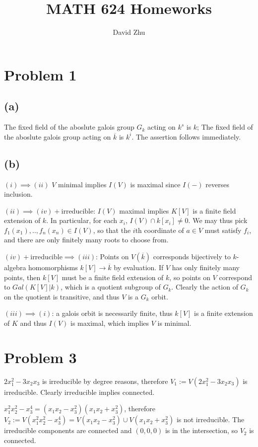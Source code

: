 \documentclass{article}
\title{MATH 624 Homeworks}
\author{David Zhu}
\theoremstyle{definition}
\theoremstyle{definition}
\theoremstyle{definition}
\theoremstyle{definition}
\theoremstyle{definition}
\theoremstyle{definition}
\theoremstyle{definition}
\begin{document}
\maketitle

\section*{Problem 1}
\subsection*{(a)}
The fixed field of the aboslute galois group $G_k$ acting on $k^s$ is $k$; The fixed field of the aboslute galois group acting on $\overline{k}$ is $k^i$. The assertion follows immediately. 


\subsection*{(b)}
$(i)\implies (ii)$ $V$ minimal implies $I(V)$ is maximal since $I(-)$ reverses inclusion. 

$(ii)\implies (iv)+\textrm{irreducible}$: $I(V)$ maximal implies $K[V]$ is a finite field extension of $k$. In particular, for each $x_i$, $I(V)\cap k[x_i]\neq 0$. We may thus pick $f_1(x_1),..,f_n(x_n)\in I(V)$, so that the $i$th  coordinate of $a\in V$ must satisfy $f_i$, and there are only finitely many roots to choose from. 

$(iv)+\textrm{irreducible}\implies (iii)$: Points on $V(\overline{k})$ corresponds bijectively to $k$-algebra homomorphisms $k[V]\to \overline{k}$ by evaluation. If $V$ has only finitely many points, then $k[V]$ must be a finite field extension of $k$, so points on $V$ correspond to $Gal(K[V]|k)$, which is a quotient subgroup of $G_k$. Clearly the action of $G_k$ on the quotient is transitive, and thus $V$ is a $G_k$ orbit. 

$(iii)\implies (i)$: a galois orbit is necessarily finite, thus $k[V]$ is a finite extension of $K$ and thus $I(V)$ is maximal, which implies $V$ is minimal.

\section*{Problem 3}
$2x_1^2-3x_2x_3$ is irreducible by degree reasons, therefore $V_1:=V(2x_1^2-3x_2x_3)$ is irreducible. Clearly irreducible implies connected. 

$x_1^2x_2^2-x_3^4=(x_1x_2-x_3^2)(x_1x_2+x_3^2)$, therefore $V_2:=V(x_1^2x_2^2-x_3^4)=V(x_1x_2-x_3^2)\cup V(x_1x_2+x_3^2)$ is not irreducible. The irreducible components are connected and $(0,0,0)$ is in the intersection, so $V_2$ is connected. 
\end{document}
